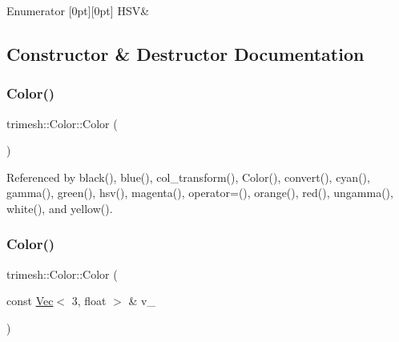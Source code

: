 \begin{DoxyEnumFields}{Enumerator}
[0pt][0pt]{}\mbox{\label{classtrimesh_1_1Color_a2e472a2f6056fb5d0d835ee1c361b6daa5239e1d12b6fbaab60f8b57960f2168b}} 
H\+SV&\\
\hline

\end{DoxyEnumFields}


\subsection{Constructor \& Destructor Documentation}
\mbox{\label{classtrimesh_1_1Color_a5f3b1f0bc94c9d5961b6ec18d7b5680b}} 
\subsubsection{\texorpdfstring{Color()}{Color()}\hspace{0.1cm}{\footnotesize\ttfamily [1/13]}}
{\footnotesize\ttfamily trimesh\+::\+Color\+::\+Color (\begin{DoxyParamCaption}{ }\end{DoxyParamCaption})\hspace{0.3cm}{\ttfamily [inline]}}



Referenced by black(), blue(), col\+\_\+transform(), Color(), convert(), cyan(), gamma(), green(), hsv(), magenta(), operator=(), orange(), red(), ungamma(), white(), and yellow().

\mbox{\label{classtrimesh_1_1Color_a28065ab275e33f2d15f6e04454b46e62}} 
\subsubsection{\texorpdfstring{Color()}{Color()}\hspace{0.1cm}{\footnotesize\ttfamily [2/13]}}
{\footnotesize\ttfamily trimesh\+::\+Color\+::\+Color (\begin{DoxyParamCaption}\item[{const \hyperlink{classtrimesh_1_1Vec}{Vec}$<$ 3, float $>$ \&}]{v\+\_\+ }\end{DoxyParamCaption})\hspace{0.3cm}{\ttfamily [inline]}}

